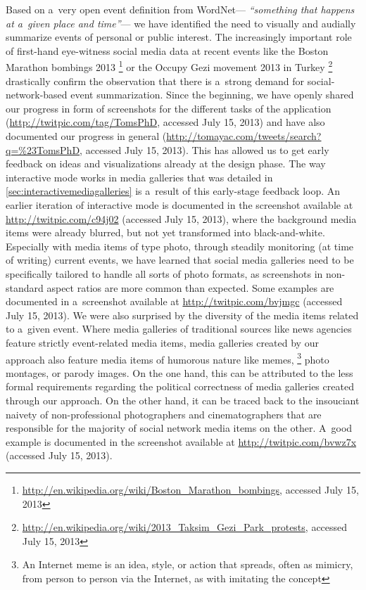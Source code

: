 Based on a~very open event definition from WordNet---%
\textit{``something that happens at a~given place and time''}---%
we have identified the need to
visually and audially summarize events
of personal or public interest.
The increasingly important role of first-hand eye-witness
social media data at recent events like the
Boston Marathon bombings 2013%
\footnote{\url{http://en.wikipedia.org/wiki/Boston_Marathon_bombings}, accessed July 15, 2013}
or the Occupy Gezi movement 2013 in Turkey%
\footnote{\url{http://en.wikipedia.org/wiki/2013_Taksim_Gezi_Park_protests}, accessed July 15, 2013}
drastically confirm the observation that there is a~strong demand
for social-network-based event summarization.
Since the beginning, we have openly shared our progress
in form of screenshots for the different tasks
of the application
(\url{http://twitpic.com/tag/TomsPhD}, accessed July 15, 2013)
and have also documented our progress in general
(\url{http://tomayac.com/tweets/search?q=%23TomsPhD}, accessed July 15, 2013).
This has allowed us to get early feedback on ideas
and visualizations already at the design phase.
The way interactive mode works in media galleries
that was detailed in \autoref{sec:interactivemediagalleries}
is a~result of this early-stage feedback loop.
An earlier iteration of interactive mode
is documented in the screenshot available at
\url{http://twitpic.com/c94j02} (accessed July 15, 2013),
where the background media items were already blurred,
but not yet transformed into black-and-white.
Especially with media items of type photo,
through steadily monitoring (at time of writing) current events,
we have learned that social media galleries
need to be specifically tailored to handle all sorts of photo formats,
as screenshots in non-standard aspect ratios
are more common than expected.
Some examples are documented in a~screenshot available
at \url{http://twitpic.com/bvjmgc} (accessed July 15, 2013).
We were also surprised by the diversity of the media items
related to a~given event.
Where media galleries of traditional sources
like news agencies feature strictly event-related media items,
media galleries created by our approach also feature
media items of humorous nature like memes,%
\footnote{An Internet meme is an idea, style, or action that spreads, often as mimicry, from person to person via the Internet, as with imitating the concept}
photo montages,
or parody images.
On the one hand, this can be attributed to the less formal requirements
regarding the political correctness of media galleries
created through our approach.
On the other hand, it can be traced back to the insouciant naivety
of non-professional photographers and cinematographers
that are responsible for the majority of social network media items on the other.
A~good example is documented in the screenshot available at
\url{http://twitpic.com/bvwz7x} (accessed July 15, 2013).

